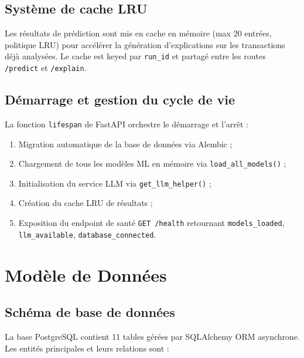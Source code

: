 \documentclass[12pt,a4paper,twoside]{report}
\theoremstyle{definition}
\begin{document}
\subsection{Système de cache LRU}

Les résultats de prédiction sont mis en cache en mémoire (max 20 entrées,
politique LRU) pour accélérer la génération d'explications sur les transactions
déjà analysées. Le cache est keyed par \texttt{run\_id} et partagé entre les
routes \texttt{/predict} et \texttt{/explain}.

\subsection{Démarrage et gestion du cycle de vie}

La fonction \texttt{lifespan} de FastAPI orchestre le démarrage et l'arrêt :

\begin{enumerate}
  \item Migration automatique de la base de données via Alembic ;
  \item Chargement de tous les modèles ML en mémoire via \texttt{load\_all\_models()} ;
  \item Initialisation du service LLM via \texttt{get\_llm\_helper()} ;
  \item Création du cache LRU de résultats ;
  \item Exposition du endpoint de santé \texttt{GET /health} retournant
    \texttt{models\_loaded}, \texttt{llm\_available}, \texttt{database\_connected}.
\end{enumerate}

\section{Modèle de Données}

\subsection{Schéma de base de données}

La base PostgreSQL contient 11 tables gérées par SQLAlchemy ORM asynchrone.
Les entités principales et leurs relations sont :
\end{document}
